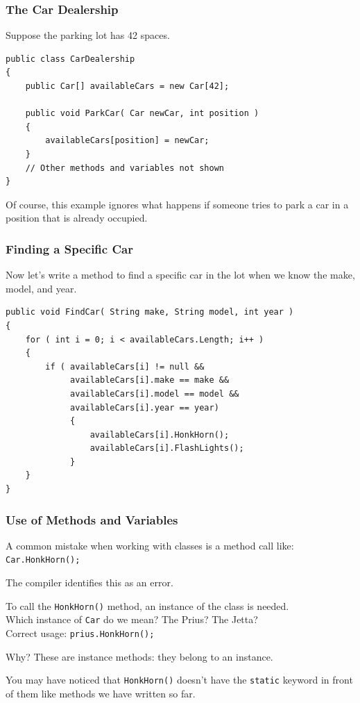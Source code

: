 \begin{frame}[fragile]
\frametitle{The Car Dealership}

Suppose the parking lot has 42 spaces.

\begin{verbatim}
public class CarDealership
{
    public Car[] availableCars = new Car[42];

    public void ParkCar( Car newCar, int position )
    {
        availableCars[position] = newCar;
    }
    // Other methods and variables not shown
}
\end{verbatim}

Of course, this example ignores what happens if someone tries to park a car in a position that is already occupied.

\end{frame}


\begin{frame}[fragile]
\frametitle{Finding a Specific Car}

Now let's write a method to find a specific car in the lot when we know the make, model, and year.

\begin{verbatim}
public void FindCar( String make, String model, int year )
{
    for ( int i = 0; i < availableCars.Length; i++ )
    {
        if ( availableCars[i] != null &&
             availableCars[i].make == make &&
             availableCars[i].model == model &&
             availableCars[i].year == year)
             {
                 availableCars[i].HonkHorn();
                 availableCars[i].FlashLights();
             }
    }
}
\end{verbatim}

\end{frame}



\begin{frame}
\frametitle{Use of Methods and Variables}
A common mistake when working with classes is a method call like:\\
\quad \texttt{Car.HonkHorn();}

The compiler identifies this as an error. 

To call the \texttt{HonkHorn()} method, an instance of the class is needed.\\
\quad Which instance of \texttt{Car} do we mean? The Prius? The Jetta?\\
\quad Correct usage: \texttt{prius.HonkHorn();}

Why? These are \alert{instance methods}: they belong to an instance. 

You may have noticed that \texttt{HonkHorn()} doesn't have the \texttt{static} keyword in front of them like methods we have written so far.

\end{frame}

